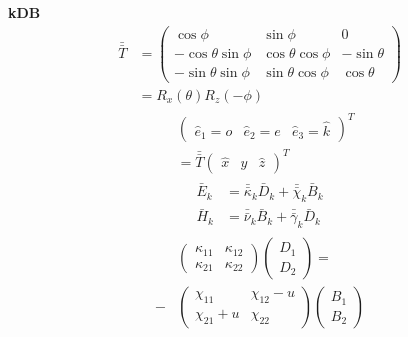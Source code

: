 \documentclass[12pt]{article}
\begin{document}
\begin{multicols}{3}
\textbf{kDB}
\begin{align}
  \bar{\bar{T}} &=
  \begin{pmatrix}
    \cos\phi & \sin\phi & 0\\
    -\cos\theta\sin\phi & \cos\theta\cos\phi & -\sin\theta\\
    -\sin\theta\sin\phi & \sin\theta\cos\phi & \cos\theta
  \end{pmatrix}\\ %
  &= R_x(\theta) R_z(-\phi)
\end{align}
\begin{align}
  \begin{split}
    &\begin{pmatrix} \hat{e}_1 = o & \hat{e}_2 = e & \hat{e}_3=\hat{k}\end{pmatrix}^T\\
    &= \bar{\bar{T}}
    \begin{pmatrix} \hat{x} & \hat{y} & \hat{z}\end{pmatrix}^T
  \end{split}
\end{align}
\begin{align}
  \bar{E}_k &= \bar{\bar{\kappa}}_k \bar{D}_k + \bar{\bar{\chi}}_k \bar{B}_k\\
  \bar{H}_k &= \bar{\bar{\nu}}_k \bar{B}_k + \bar{\bar{\gamma}}_k \bar{D}_k
\end{align}
\begin{align}
  \begin{split}
  &\begin{pmatrix}
    \kappa_{11} & \kappa_{12}\\
    \kappa_{21} & \kappa_{22}
  \end{pmatrix}
  {}\begin{pmatrix}
    D_1\\
    D_2
  \end{pmatrix} =\\
  -&\begin{pmatrix}
    \chi_{11} & \chi_{12} - u\\
    \chi_{21} + u & \chi_{22}
  \end{pmatrix}
  \begin{pmatrix}
    B_1\\
    B_2
  \end{pmatrix}
  \end{split}\\
  \begin{split}

\end{split}
\end{align}
\end{multicols}
\end{document}
